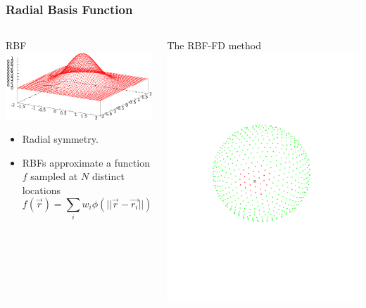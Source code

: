 \documentclass{beamer}
\begin{document}
\begin{frame}[fragile]
  \frametitle{Radial Basis Function}
  \begin{columns}

    \begin{block}{RBF}
      \includegraphics[width=\linewidth]{slides-figures/rbf.pdf}
      
      \begin{itemize}
      \item Radial symmetry.
      \item RBFs approximate a function $f$ sampled at $N$ distinct locations $$f(\vec{r}) = \sum_i w_i \phi(||\vec{r}-\vec{r_i}||)$$ 
      \end{itemize}
    \end{block}
    
    \begin{block}{The RBF-FD method}
      \includegraphics[width=.8\linewidth]{slides-figures/ICS-figures/RBFStencil_n32_a}
      

\end{block}
\end{columns}
\end{frame}
\end{document}
